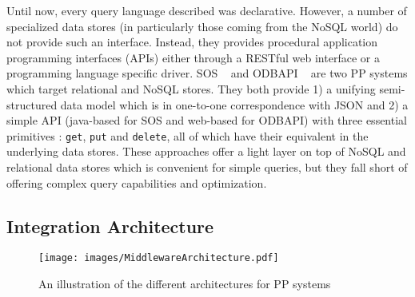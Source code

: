 Until now, every query language described was declarative. However, a number of specialized data stores (in particularly those coming from the NoSQL world) do not provide such an interface. Instead, they provides procedural application programming interfaces (APIs) either through a RESTful web interface or a programming language specific driver. SOS ~\cite{Atzeni2012} and ODBAPI ~\cite{Sellami2014} are two PP systems which target relational and NoSQL stores. They both provide 1) a unifying semi-structured data model which is in one-to-one correspondence with JSON and 2) a simple API (java-based for SOS and web-based for ODBAPI) with three essential primitives : \texttt{get}, \texttt{put} and \texttt{delete}, all of which have their equivalent in the underlying data stores. These approaches offer a light layer on top of NoSQL and relational data stores which is convenient for simple queries, but they fall short of offering complex query capabilities and optimization. 
















\subsection{Integration Architecture}

\begin{figure}
 \centering
  \texttt{[image: images/MiddlewareArchitecture.pdf]}
  \caption{An illustration of the different architectures for PP systems}
  \label{fig:architectures}
\end{figure}

